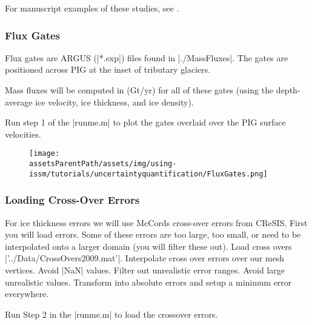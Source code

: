 For manuscript examples of these studies, see
\cite{Larour2012a,Larour2012b,Schlegel2013,Schlegel2015}.

\subsubsection{Flux Gates} %
Flux gates are ARGUS (\lstinlinebg|*.exp|) files found in \lstinlinebg|./MassFluxes|. The gates are positioned across PIG at the inset of tributary glaciers.

Mass fluxes will be computed in (Gt/yr) for all of these gates (using the depth-average ice velocity, ice thickness, and ice density).

Run step 1 of the \lstinlinebg|runme.m| to plot the gates overlaid over the PIG surface velocities.
\begin{figure}[H]
	\begin{center}
		\texttt{[image: \\assetsParentPath/assets/img/using-issm/tutorials/uncertaintyquantification/FluxGates.png]}
	\end{center}
\end{figure}
\subsubsection{Loading Cross-Over Errors} %
For ice thickness errors we will use McCords cross-over errors from CReSIS. First you will load errors. Some of these errors are too large, too small, or need to be interpolated onto a larger domain (you will filter these out). Load cross overs \lstinlinebg|'../Data/CrossOvers2009.mat'|. Interpolate cross over errors over our mesh vertices. Avoid \lstinlinebg|NaN| values. Filter out unrealistic error ranges. Avoid large unrealistic values. Transform into absolute errors and setup a minimum error everywhere.

Run Step 2 in the \lstinlinebg|runme.m| to load the crossover errors.
